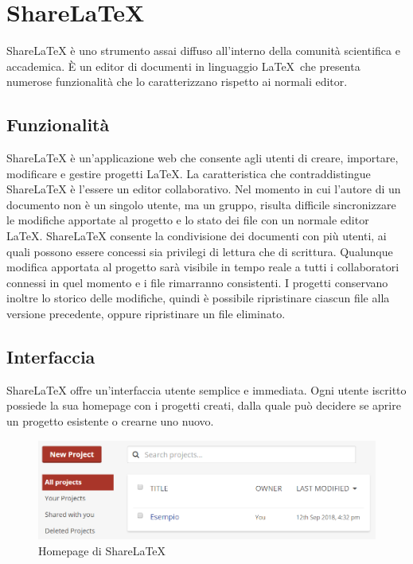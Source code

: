 \chapter{ShareLaTeX}
\label{ShareLaTeX}
\thispagestyle{empty}

ShareLaTeX è uno strumento assai diffuso all'interno della comunità scientifica e accademica. È un editor di documenti in linguaggio \LaTeX ~che presenta numerose funzionalità che lo caratterizzano rispetto ai normali editor.

\section{Funzionalità}

ShareLaTeX è un'applicazione web che consente agli utenti di creare, importare, modificare e gestire progetti \LaTeX. La caratteristica che contraddistingue ShareLaTeX è l'essere un editor collaborativo. Nel momento in cui l'autore di un documento non è un singolo utente, ma un gruppo, risulta difficile sincronizzare le modifiche apportate al progetto e lo stato dei file con un normale editor \LaTeX. ShareLaTeX consente la condivisione dei documenti con più utenti, ai quali possono essere concessi sia privilegi di lettura che di scrittura. Qualunque modifica apportata al progetto sarà visibile in tempo reale a tutti i collaboratori connessi in quel momento e i file rimarranno consistenti. I progetti conservano inoltre lo storico delle modifiche, quindi è possibile ripristinare ciascun file alla versione precedente, oppure ripristinare un file eliminato.

\section{Interfaccia}
ShareLaTeX offre un'interfaccia utente semplice e immediata. Ogni utente iscritto possiede la sua homepage con i progetti creati, dalla quale può decidere se aprire un progetto esistente o crearne uno nuovo.
\begin{figure}[h]
    \centering
    \includegraphics[scale=0.7]{immagini/homepage.PNG}
    \caption{Homepage di ShareLaTeX}
    \label{fig:sharelatex_homepage}
\end{figure}


